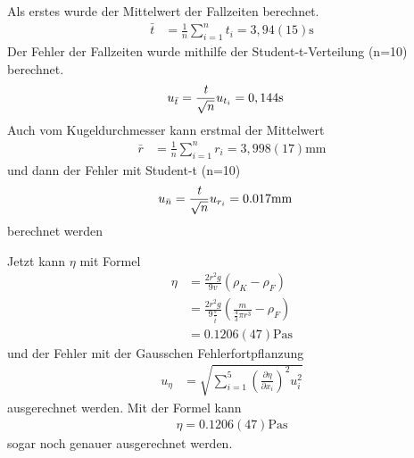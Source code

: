 \documentclass[11pt, a4paper]{article}
\begin{document}
    Als erstes wurde der Mittelwert der Fallzeiten berechnet.
    \begin{align}
        \bar{t} &= \frac{1}{n} \sum_{i=1}^{n} t_i = 3,94(15) \si{\second}
    \end{align}
    Der Fehler der Fallzeiten wurde mithilfe der Student-t-Verteilung (n=10) berechnet.
    \begin{align}
        u_{\bar{t}} &= \frac{{\it t}}{\sqrt{n}} u_{t_i} =  0,144 \si{\second}
    \end{align}
    Auch vom Kugeldurchmesser kann erstmal der Mittelwert
    \begin{align}
        \bar{r} &= \frac{1}{n} \sum_{i=1}^{n} r_i = 3,998(17) \si{\milli\metre}
    \end{align}
    und dann der Fehler mit Student-t (n=10)
    \begin{align}
        u_{\bar{n}} &= \frac{{\it t}}{\sqrt{n}} u_{r_i} = 0.017 \si{\milli\metre}
    \end{align}
    berechnet werden

    Jetzt kann $\eta$ mit Formel \cite[(11)]{VIS}
    \begin{align}
        \eta &= \frac{2r^2g}{9v}(\rho_K - \rho_F)  \nonumber \\
        &= \frac{2r^2g}{9\frac{s}{\bar{t}}}(\frac{m}{\frac{4}{3} \pi r^3} - \rho_F) \nonumber \\
        &= 0.1206(47) \si{\pascal\second}
    \end{align}
    und der Fehler mit der Gausschen Fehlerfortpflanzung \cite{ABW}
    \begin{align}
        u_{\eta} &= \sqrt{\sum^5_{i = 1}\left(\frac{\partial \eta}{\partial x_i}\right)^2 u_i^2}
    \end{align}
    ausgerechnet werden.
    Mit der Formel \cite[(12)]{VIS} kann
    \begin{align}
        \eta = 0.1206(47) \si{\pascal\second}
    \end{align}
    sogar noch genauer ausgerechnet werden.

    
    
\end{document}
